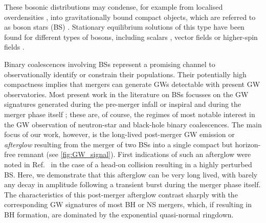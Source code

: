 \documentclass[aps,twocolumn,nofootinbib,superscriptaddress,amsfonts,floatfix
]{revtex4-1} %
\begin{document}
These bosonic distributions may condense, for example from localised overdensities \cite{Widdicombe:2018oeo}, into gravitationally bound compact objects, which are referred to as boson stars (BS) \cite{Amin:2018xfe,PhysRev.172.1331,PhysRev.187.1767,PhysRev.97.511,Visinelli:2021uve,Liebling:2012fv,Schunck:2003kk,Guerra:2019srj,Vaglio:2022flq,Cardoso:2022vpj,Amin:2021tnq,Zhang:2020bec}. Stationary equilibrium solutions of this type have been
found for different types of bosons, including scalars \cite{Sanchis-Gual:2020mzb,Alcubierre:2021psa,Boskovic:2021nfs,Astefanesei:2003qy,Kaup:1968zz,Ruffini:1969qy,Colpi:1986ye,Lee:1986ts,Friedberg:1986tq,Schunck:1999zu,Jetzer:1989av,Pugliese:2013gsa,Hawley:2002zn,Urena-Lopez:2012udq,Muia:2019coe,Helfer:2016ljl,Alcubierre:2018ahf,Coleman:1985ki,Guerra:2019srj,Kleihaus:2005me,Kleihaus:2011sx,Cardoso:2014sna,Amin:2014fua,Amin:2011hj,Amin:2010dc}, vector fields \cite{Brito:2015pxa,Minamitsuji:2018kof,Brito:2015yga,Zhang:2021xxa,CalderonBustillo:2022cja,March-Russell:2022zll,Gorghetto:2022sue,Herdeiro:2021lwl,Bustillo:2020syj,Minamitsuji:2017pdr,Sanchis-Gual:2017bhw,Duarte:2016lig,SalazarLandea:2016bys,Zilhao:2015tya} or higher-spin fields \cite{Jain:2021pnk}.

Binary coalescences involving BSs
represent a promising channel to observationally
identify or constrain their populations. Their potentially high compactness implies that mergers can generate GWs detectable with present GW observatories. Most present work in the literature on BSs focusses on the GW signatures generated during the pre-merger infall or inspiral
\cite{Herdeiro:2020kba,Cardoso:2017cfl,Sennett:2017etc,Diamond:2021dth,Pacilio:2020jza} and during the
merger phase itself \cite{Amin:2020vja,Sanchis-Gual:2018oui,Sanchis-Gual:2020mzb,Sanchis_Gual_2019,Widdicombe:2019woy,
Helfer:2018vtq,Palenzuela:2017kcg,Bezares:2018qwa,Liebling:2012fv,Choptuik:2009ww,Palenzuela:2007dm,Bezares:2017mzk,
Palenzuela:2006wp,Dietrich:2018jov,Dietrich:2018bvi,Jaramillo:2022zwg,Bezares:2022obu,Macedo:2013jja}; these are, of course, the regimes of most notable
interest in the GW observation of neutron-star and black-hole
binary coalescences. The main focus of our work, however, is
the long-lived post-merger GW emission or {\it afterglow} resulting
from the merger of two BSs into a single compact but horizon-free
remnant (see \cref{fig:GW_signal}).
First indications of such an afterglow were noted in Ref.~\cite{Helfer:2018vtq} in the case of a head-on collision resulting in a highly perturbed BS. Here, we demonstrate that this afterglow can be very long lived, with barely any decay in amplitude following a transient burst during the merger phase itself. The characteristics of this post-merger afterglow contrast sharply with the corresponding GW signatures of most BH or NS mergers, which, if
resulting in BH formation, are dominated by the exponential quasi-normal ringdown. 
\end{document}
